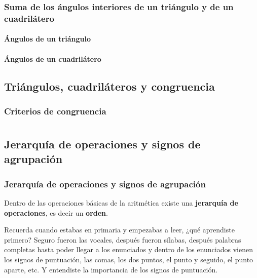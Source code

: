 \documentclass[11pt]{book}
\begin{document}
\subsection{Suma de los \'angulos interiores de un tri\'angulo y de un cuadril\'atero}
\subsubsection{\'Angulos de un tri\'angulo}
\subsubsection{\'Angulos de un cuadril\'atero}
\newpage \thispagestyle{plain}
\section{Tri\'angulos, cuadril\'ateros y congruencia}
\subsection{Criterios de congruencia}

\newpage \thispagestyle{plain}
\chapter{}
\newpage \thispagestyle{plain}
\section{Jerarqu\'ia de operaciones y signos de agrupaci\'on}

\subsection{Jerarqu\'ia de operaciones y signos de agrupaci\'on}
Dentro de las operaciones básicas de la aritmética existe una \textbf{jerarquía de operaciones}, es decir un
\textbf{orden}.

Recuerda cuando estabas en primaria y empezabas a leer, ¿qué aprendiste primero? Seguro fueron las vocales,
después fueron sílabas, después palabras completas hasta poder llegar a los enunciados y dentro de los enunciados
vienen los signos de puntuación, las comas, los dos puntos, el punto y seguido, el punto aparte, etc.
Y entendiste la importancia de los signos de puntuación.
\end{document}
